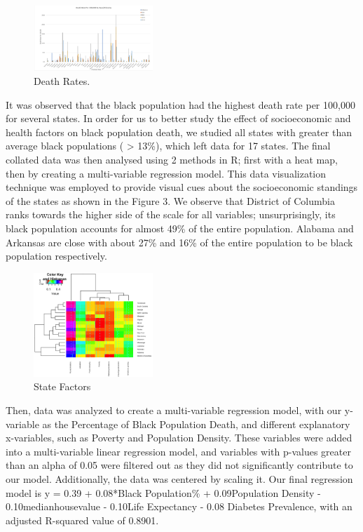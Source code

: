 \documentclass[10pt,twocolumn,letterpaper]{article}
\begin{document}
\begin{figure}
  \centering
  \includegraphics[width=0.4\textwidth]{figures/Flora.png}
  \caption{Death Rates.}
\end{figure} 

It was observed that the black population had the highest death rate per 100,000 for several states. In order for us to better study the effect of socioeconomic and health factors on black population death, we studied all states with greater than average black populations ( > 13\%), which left data for 17 states. 
The final collated data was then analysed using 2 methods in R; first with a heat map, then by creating a multi-variable regression model. This data visualization technique was employed to provide visual cues about the socioeconomic standings of the states as shown in the Figure 3. We observe that District of Columbia ranks towards the higher side of the scale for all variables; unsurprisingly, its black population accounts for almost 49\% of the entire population. Alabama and Arkansas are close with about 27\% and 16\% of the entire population to be black population respectively. 
\begin{figure}
  \centering
  \includegraphics[width=0.4\textwidth]{figures/PLOT.png}
  \caption{State Factors}
\end{figure}
Then, data was analyzed to create a multi-variable regression model, with our y-variable as the Percentage of Black Population Death, and different explanatory x-variables, such as Poverty and Population Density. These variables were added into a multi-variable linear regression model, and variables with p-values greater than an alpha of 0.05 were filtered out as they did not significantly contribute to our model. Additionally, the data was centered by scaling it. Our final regression model is y = 0.39 + 0.08*Black Population\% + 0.09Population Density - 0.10medianhousevalue - 0.10Life Expectancy - 0.08 Diabetes Prevalence, with an adjusted R-squared value of 0.8901. 
\end{document}
